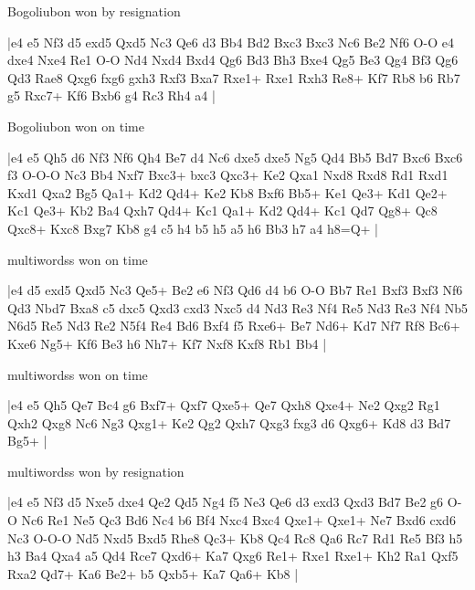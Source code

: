 \showboard

Bogoliubon won by resignation

\makegametitle
|e4 e5 Nf3 d5 exd5 Qxd5 Nc3 Qe6 d3 Bb4 Bd2 Bxc3 Bxc3 Nc6 Be2 Nf6 O-O e4 dxe4 Nxe4 Re1 O-O Nd4 Nxd4 Bxd4 Qg6 Bd3 Bh3 Bxe4 Qg5 Be3 Qg4 Bf3 Qg6 Qd3 Rae8 Qxg6 fxg6 gxh3 Rxf3 Bxa7 Rxe1+ Rxe1 Rxh3 Re8+ Kf7 Rb8 b6 Rb7 g5 Rxc7+ Kf6 Bxb6 g4 Rc3 Rh4 a4  |

\showboard

Bogoliubon won on time

\makegametitle
|e4 e5 Qh5 d6 Nf3 Nf6 Qh4 Be7 d4 Nc6 dxe5 dxe5 Ng5 Qd4 Bb5 Bd7 Bxc6 Bxc6 f3 O-O-O Nc3 Bb4 Nxf7 Bxc3+ bxc3 Qxc3+ Ke2 Qxa1 Nxd8 Rxd8 Rd1 Rxd1 Kxd1 Qxa2 Bg5 Qa1+ Kd2 Qd4+ Ke2 Kb8 Bxf6 Bb5+ Ke1 Qe3+ Kd1 Qe2+ Kc1 Qe3+ Kb2 Ba4 Qxh7 Qd4+ Kc1 Qa1+ Kd2 Qd4+ Kc1 Qd7 Qg8+ Qc8 Qxc8+ Kxc8 Bxg7 Kb8 g4 c5 h4 b5 h5 a5 h6 Bb3 h7 a4 h8=Q+  |

\showboard

multiwordss won on time

\makegametitle
|e4 d5 exd5 Qxd5 Nc3 Qe5+ Be2 e6 Nf3 Qd6 d4 b6 O-O Bb7 Re1 Bxf3 Bxf3 Nf6 Qd3 Nbd7 Bxa8 c5 dxc5 Qxd3 cxd3 Nxc5 d4 Nd3 Re3 Nf4 Re5 Nd3 Re3 Nf4 Nb5 N6d5 Re5 Nd3 Re2 N5f4 Re4 Bd6 Bxf4 f5 Rxe6+ Be7 Nd6+ Kd7 Nf7 Rf8 Bc6+ Kxe6 Ng5+ Kf6 Be3 h6 Nh7+ Kf7 Nxf8 Kxf8 Rb1 Bb4  |

\showboard

multiwordss won on time

\makegametitle
|e4 e5 Qh5 Qe7 Bc4 g6 Bxf7+ Qxf7 Qxe5+ Qe7 Qxh8 Qxe4+ Ne2 Qxg2 Rg1 Qxh2 Qxg8 Nc6 Ng3 Qxg1+ Ke2 Qg2 Qxh7 Qxg3 fxg3 d6 Qxg6+ Kd8 d3 Bd7 Bg5+  |

\showboard

multiwordss won by resignation

\makegametitle
|e4 e5 Nf3 d5 Nxe5 dxe4 Qe2 Qd5 Ng4 f5 Ne3 Qe6 d3 exd3 Qxd3 Bd7 Be2 g6 O-O Nc6 Re1 Ne5 Qc3 Bd6 Nc4 b6 Bf4 Nxc4 Bxc4 Qxe1+ Qxe1+ Ne7 Bxd6 cxd6 Nc3 O-O-O Nd5 Nxd5 Bxd5 Rhe8 Qc3+ Kb8 Qc4 Rc8 Qa6 Rc7 Rd1 Re5 Bf3 h5 h3 Ba4 Qxa4 a5 Qd4 Rce7 Qxd6+ Ka7 Qxg6 Re1+ Rxe1 Rxe1+ Kh2 Ra1 Qxf5 Rxa2 Qd7+ Ka6 Be2+ b5 Qxb5+ Ka7 Qa6+ Kb8  |

